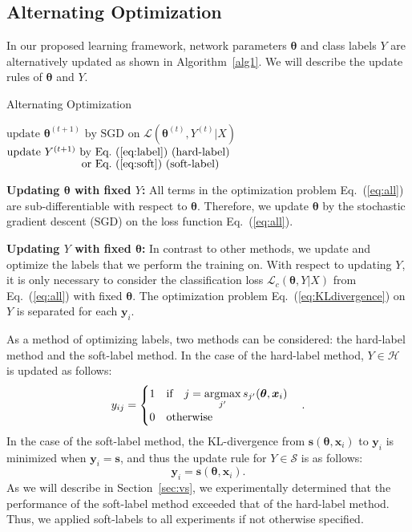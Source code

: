 \documentclass[10pt,twocolumn,letterpaper]{article}
\newcommand{\argmax}{\mathop{\rm argmax}\limits}
\newcommand{\Eref}[1]{Eq.~(\ref{#1})}
\newcommand{\Aref}[1]{Algorithm~\ref{#1}}
\newcommand{\Sref}[1]{Section~\ref{#1}}
\begin{document}
\subsection{Alternating Optimization}\label{sec:alt}
In our proposed learning framework, network parameters $\bm{\theta}$ and class labels $Y$ are alternatively updated as shown in \Aref{alg1}.
We will describe the update rules of $\bm{\theta}$ and $Y$.

\addtolength\textfloatsep{-5mm}
\begin{algorithm}[t]
	\caption{Alternating Optimization}
	\label{alg1}
	\begin{algorithmic}
		\STATE $\text{update }\bm{\theta}^{(t+1)}\text{ by SGD on }\mathcal{L}(\bm{\theta}^{(t)},Y^{(t)}|X)$
		\STATE $\text{update }Y^{(t+1)}\text{ by \Eref{eq:label} (hard-label)}$
    \STATE $\text{\quad\quad\quad\quad\quad\quad\ \  or \Eref{eq:soft} (soft-label)}$
		\ENDFOR
	\end{algorithmic}
\end{algorithm}

\vspace{2mm}\noindent\textbf{Updating $\bm{\theta}$ with fixed $Y$:}
All terms in the optimization problem \Eref{eq:all} are sub-differentiable with respect to $\bm{\theta}$. Therefore, we update $\bm{\theta}$ by the stochastic gradient descent (SGD) on the loss function \Eref{eq:all}.

\vspace{2mm}\noindent\textbf{Updating $Y$ with fixed $\bm{\theta}$:}
In contrast to other methods, we update and optimize the labels that we perform the training on.
With respect to updating $Y$, it is only necessary to consider the classification loss $\mathcal{L}_c(\bm{\theta},Y|X)$ from \Eref{eq:all} with fixed $\bm{\theta}$. The optimization problem \Eref{eq:KLdivergence} on $Y$ is separated for each $\bm{y}_i$.

As a method of optimizing labels, two methods can be considered: the hard-label method and the soft-label method.
In the case of the hard-label method, $Y\in\mathcal{H}$ is updated as follows:
\begin{equation}\label{eq:label}
y_{ij} =
\begin{cases}
1\quad\text{if}\quad j = \argmax_{j'}s_{j'}(\bm{\theta},\bm{x}_i)\\
0\quad\text{otherwise}
\end{cases}.
\end{equation}
In the case of the soft-label method, the KL-divergence from $\bm{s}(\bm{\theta},\bm{x}_i)$ to $\bm{y}_i$ is minimized when $\bm{y}_i=\bm{s}$, and thus the update rule for $Y\in\mathcal{S}$ is as follows:
\begin{equation}\label{eq:soft}
\bm{y}_i=\bm{s}(\bm{\theta},\bm{x}_i).
\end{equation}
As we will describe in \Sref{sec:vs}, we experimentally determined that the performance of the soft-label method exceeded that of the hard-label method. Thus, we applied soft-labels to all experiments if not otherwise specified.
\end{document}
